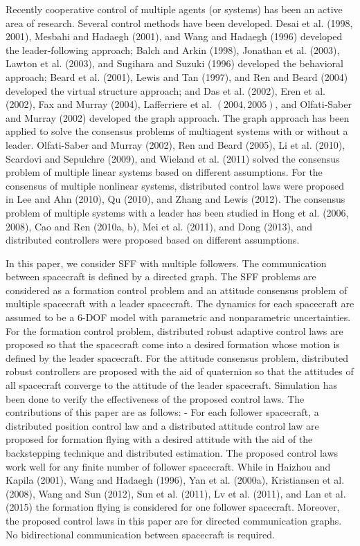 \documentclass[10pt]{article}
\begin{document}
Recently cooperative control of multiple agents (or systems) has been an active area of research. Several control methods have been developed. Desai et al. (1998, 2001), Mesbahi and Hadaegh (2001), and Wang and Hadaegh (1996) developed the leader-following approach; Balch and Arkin (1998), Jonathan et al. (2003), Lawton et al. (2003), and Sugihara and Suzuki (1996) developed the behavioral approach; Beard et al. (2001), Lewis and Tan (1997), and Ren and Beard (2004) developed the virtual structure approach; and Das et al. (2002), Eren et al. (2002), Fax and Murray (2004), Lafferriere et al. $(2004,2005)$, and Olfati-Saber and Murray (2002) developed the graph approach. The graph approach has been applied to solve the consensus problems of multiagent systems with or without a leader. Olfati-Saber and Murray (2002), Ren and Beard (2005), Li et al. (2010), Scardovi and Sepulchre (2009), and Wieland et al. (2011) solved the consensus problem of multiple linear systems based on different assumptions. For the consensus of multiple nonlinear systems, distributed control laws were proposed in Lee and Ahn (2010), Qu (2010), and Zhang and Lewis (2012). The consensus problem of multiple systems with a leader has been studied in Hong et al. (2006, 2008), Cao and Ren (2010a, b), Mei et al. (2011), and Dong (2013), and distributed controllers were proposed based on different assumptions.

In this paper, we consider SFF with multiple followers. The communication between spacecraft is defined by a directed graph. The SFF problems are considered as a formation control problem and an attitude consensus problem of multiple spacecraft with a leader spacecraft. The dynamics for each spacecraft are assumed to be a 6-DOF model with parametric and nonparametric uncertainties. For the formation control problem, distributed robust adaptive control laws are proposed so that the spacecraft come into a desired formation whose motion is defined by the leader spacecraft. For the attitude consensus problem, distributed robust controllers are proposed with the aid of quaternion so that the attitudes of all spacecraft converge to the attitude of the leader spacecraft. Simulation has been done to verify the effectiveness of the proposed control laws. The contributions of this paper are as follows: - For each follower spacecraft, a distributed position control law and a distributed attitude control law are proposed for formation flying with a desired attitude with the aid of the backstepping technique and distributed estimation. The proposed control laws work well for any finite number of follower spacecraft. While in Haizhou and Kapila (2001), Wang and Hadaegh (1996), Yan et al. (2000a), Kristiansen et al. (2008), Wang and Sun (2012), Sun et al. (2011), Lv et al. (2011), and Lan et al. (2015) the formation flying is considered for one follower spacecraft. Moreover, the proposed control laws in this paper are for directed communication graphs. No bidirectional communication between spacecraft is required.
\end{document}
